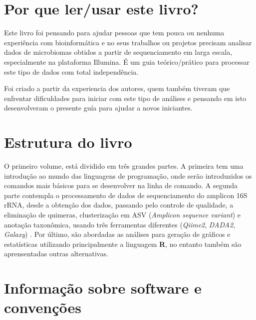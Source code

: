 \documentclass[
]{book}
\begin{document}
\hypertarget{por-que-lerusar-este-livro}{%
\section*{Por que ler/usar este livro?}\label{por-que-lerusar-este-livro}}

Este livro foi pensando para ajudar pessoas que tem pouca ou nenhuma experiência com bioinformática e no seus trabalhos ou projetos precisam analisar dados de microbiomas obtidos a partir de sequenciamento em larga escala, especialmente na plataforma Illumina. É um guia teórico/prático para processar este tipo de dados com total independência.

Foi criado a partir da experiencia dos autores, quem também tiveram que enfrentar dificuldades para iniciar com este tipo de análises e pensando em isto desenvolveram o presente guía para ajudar a novos iniciantes.

\hypertarget{estrutura-do-livro}{%
\section*{Estrutura do livro}\label{estrutura-do-livro}}

O primeiro volume, está dividido em três grandes partes. A primeira tem uma introdução ao mundo das linguagens de programação, onde serão introduzidos os comandos mais básicos para se desenvolver na linha de comando. A segunda parte contempla o processamento de dados de sequenciamento do amplicon 16S rRNA, desde a obtenção dos dados, passando pelo controle de qualidade, a eliminação de quimeras, clusterização em ASV (\emph{Amplicon sequence variant}) e anotação taxonômica, usando três ferramentas diferentes (\emph{Qiime2}, \emph{DADA2}, \emph{Galaxy}) . Por último, são abordadas as análises para geração de gráficos e estatísticas utilizando principalmente a linguagem \textbf{R}, no entanto também são aprensentadas outras alternativas.

\hypertarget{informauxe7uxe3o-sobre-software-e-convenuxe7uxf5es}{%
\section*{Informação sobre software e convenções}\label{informauxe7uxe3o-sobre-software-e-convenuxe7uxf5es}}
\end{document}
